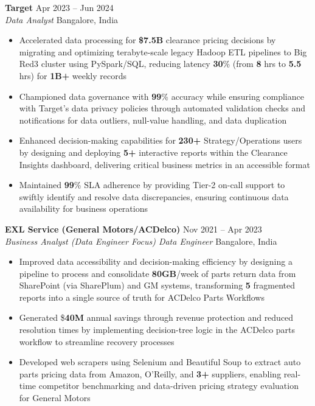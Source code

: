 \documentclass{extarticle}
\begin{document}
\vspace{3pt}

{\fontsize{10.5pt}{12pt}\selectfont\textbf{Target}} \hfill Apr 2023 -- Jun 2024\\
\textit{Data Analyst} \hfill Bangalore, India
\begin{itemize}
    \item Accelerated data processing for \textbf{\$7.5B} clearance pricing decisions by migrating and optimizing terabyte-scale legacy Hadoop ETL pipelines to Big Red3 cluster using PySpark/SQL, reducing latency \textbf{30}\% (from \textbf{8} hrs to \textbf{5.5} hrs) for \textbf{1B+} weekly records
    \item Championed data governance with \textbf{99}\% accuracy while ensuring compliance with Target's data privacy policies through automated validation checks and notifications for data outliers, null-value handling, and data duplication
    \item Enhanced decision-making capabilities for \textbf{230+} Strategy/Operations users by designing and deploying \textbf{5+} interactive reports within the Clearance Insights dashboard, delivering critical business metrics in an accessible format
    \item Maintained \textbf{99}\% SLA adherence by providing Tier-2 on-call support to swiftly identify and resolve data discrepancies, ensuring continuous data availability for business operations
\end{itemize}

\par\vspace{3pt}

{\fontsize{10.5pt}{12pt}\selectfont\textbf{EXL Service (General Motors/ACDelco)}} \hfill Nov 2021 -- Apr 2023\\
\textit{Business Analyst (Data Engineer Focus) \textbar\hspace{0.1em} Data Engineer} \hfill Bangalore, India
\begin{itemize}
    \item Improved data accessibility and decision-making efficiency by designing a pipeline to process and consolidate \textbf{80GB}/week of parts return data from SharePoint (via SharePlum) and GM systems, transforming \textbf{5} fragmented reports into a single source of truth for ACDelco Parts Workflows
    \item Generated \$\textbf{40M} annual savings through revenue protection and reduced resolution times by implementing decision-tree logic in the ACDelco parts workflow to streamline recovery processes
    \item Developed web scrapers using Selenium and Beautiful Soup to extract auto parts pricing data from Amazon, O'Reilly, and \textbf{3+} suppliers, enabling real-time competitor benchmarking and data-driven pricing strategy evaluation for General Motors
\end{itemize}
\end{document}

